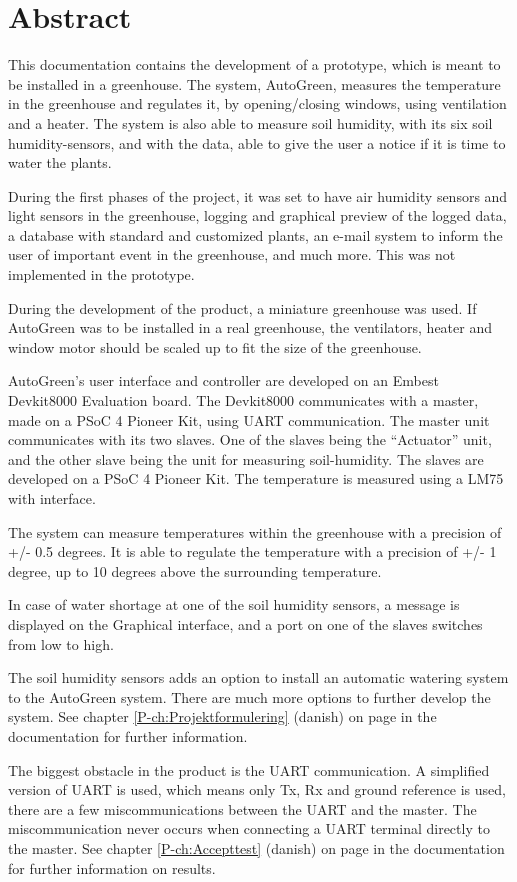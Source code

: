 \chapter{Abstract}
\label{ch:Abstract}

This documentation contains the development of a prototype, which is meant to be installed in a greenhouse. The system, AutoGreen, measures the temperature in the greenhouse and regulates it, by opening/closing windows, using ventilation and a heater. The system is also able to measure soil humidity, with its six soil humidity-sensors, and with the data, able to give the user a notice if it is time to water the plants.

During the first phases of the project, it was set to have air humidity sensors and light sensors in the greenhouse, logging and graphical preview of the logged data, a database with standard and customized plants, an e-mail system to inform the user of important event in the greenhouse, and much more. This was not implemented in the prototype.

During the development of the product, a miniature greenhouse was used. If AutoGreen was to be installed in a real greenhouse, the ventilators, heater and window motor should be scaled up to fit the size of the greenhouse.

AutoGreen’s user interface and controller are developed on an Embest Devkit8000 Evaluation board\cite{lib:DK8000}. The Devkit8000 communicates with a \IIC master, made on a PSoC 4 Pioneer Kit\cite{lib:psoc4_guide}, using UART communication. The master unit communicates with its two \IIC slaves. One of the slaves being the “Actuator” unit, and the other slave being the unit for measuring soil-humidity. The slaves are developed on a PSoC 4 Pioneer Kit. The temperature is measured using a LM75 with \IIC interface\cite{lib:LM75}.

The system can measure temperatures within the greenhouse with a precision of +/- 0.5 degrees. It is able to regulate the temperature with a precision of +/- 1 degree, up to 10 degrees above the surrounding temperature. 

In case of water shortage at one of the soil humidity sensors, a message is displayed on the Graphical interface, and a port on one of the \IIC slaves switches from low to high.

The soil humidity sensors adds an option to install an automatic watering system to the AutoGreen system. There are much more options to further develop the system. See chapter \ref{P-ch:Projektformulering}  (danish) on page \pageref{P-ch:Projektformulering} in the documentation for further information. 

The biggest obstacle in the product is the UART communication. A simplified version of UART is used, which means only Tx, Rx and ground reference is used, there are a few miscommunications between the UART and the \IIC master. The miscommunication never occurs when connecting a UART terminal directly to the \IIC master. See chapter \ref{P-ch:Accepttest}  (danish) on page \pageref{P-ch:Accepttest} in the documentation for further information on results.

\clearpage
